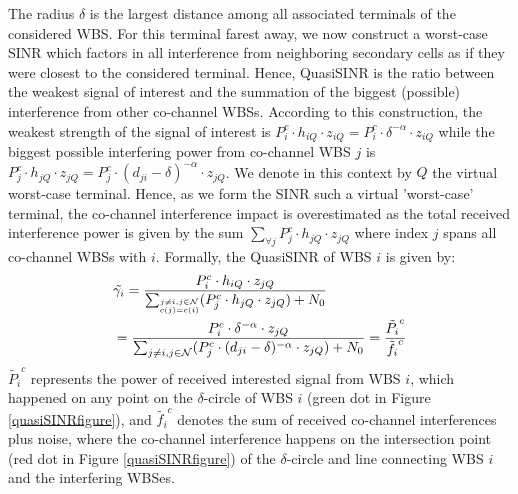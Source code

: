 The radius $\delta$ is the largest distance among all associated terminals of the considered WBS.
For this terminal farest away, we now construct a worst-case SINR which factors in all interference from neighboring secondary cells as if they were closest to the considered terminal. Hence, QuasiSINR is the ratio between the weakest signal of interest and the summation of the biggest (possible) interference from other co-channel WBSs. According to this construction, the weakest strength of the signal of interest is $P_i^c\cdot h_{iQ}\cdot z_{iQ} = P_i^c\cdot \delta^{-\alpha}\cdot z_{iQ}$ while the biggest possible interfering power from co-channel WBS $j$ is $P_j^c\cdot h_{jQ}\cdot z_{jQ} = P_j^c\cdot (d_{ji}-\delta)^{-\alpha}\cdot z_{jQ}$. We denote in this context by $Q$ the virtual worst-case terminal.
Hence, as we form the SINR such a virtual 'worst-case' terminal, the co-channel interference impact is overestimated as the total received interference power is given by the sum $\sum_{\forall j}P_j^c\cdot h_{jQ}\cdot z_{jQ}$ where index $j$ spans all co-channel WBSs with $i$. Formally, the QuasiSINR of WBS $i$ is given by:
\begin{equation}
\label{quasiSINR}
\begin{aligned}
& \tilde{\gamma_{i}} = \frac{P_{i}^c \cdot h_{iQ} \cdot z_{jQ}} {\sum_{\tiny\substack{j\neq i, j\in \mathcal{N}\\c(j)=c(i)}} (P_j^c \cdot h_{jQ} \cdot z_{jQ}) + N_0}\\
& = \frac{P_{i}^c \cdot \delta^{-\alpha}\cdot z_{jQ}} {\sum_{j\neq i, j\in \mathcal{N}} (P_j^c \cdot (d_{ji}-\delta)^{-\alpha} \cdot z_{jQ}) + N_0} = \frac{\tilde{P_i}^c}{\tilde{f_i}^c}
\end{aligned}
\end{equation}
$\tilde{P_i}^c$ represents the power of received interested signal from WBS $i$, which happened on any point on the $\delta$-circle of WBS $i$ (green dot in Figure \ref{quasiSINRfigure}), and $\tilde{f_i}^c$ denotes the sum of received co-channel interferences plus noise, where the co-channel interference happens on the intersection point (red dot in Figure \ref{quasiSINRfigure}) of the $\delta$-circle and line connecting WBS $i$ and the interfering WBSes. 

